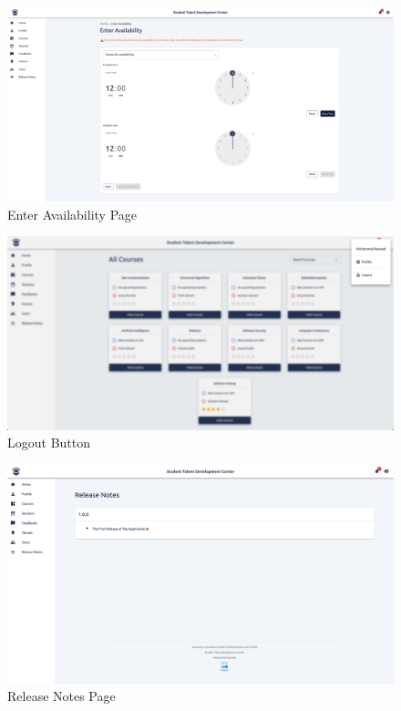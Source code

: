 \begin{justify}
    \begin{figure}[H]
        \centerline{\includegraphics[width=150mm,scale=1]{figures/implementation_and_testing/implementation/frontend/pages/Enter Availability.png}}
        \caption{Enter Availability Page}
    \end{figure}

    \begin{figure}[H]
        \centerline{\includegraphics[width=150mm,scale=1]{figures/implementation_and_testing/implementation/frontend/pages/logout.png}}
        \caption{Logout Button}
    \end{figure}

    \begin{figure}[H]
        \centerline{\includegraphics[width=150mm,scale=1]{figures/implementation_and_testing/implementation/frontend/pages/Release Notes.png}}
        \caption{Release Notes Page}
    \end{figure}


\end{justify}
